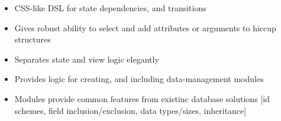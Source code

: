 






\medskip



\vspace{-0.2cm}
\vspace{0.2cm}

\begin{itemize}
  \item CSS-like DSL for state dependencies, and transitions
  \item Gives robust ability to select and add attributes or arguments to hiccup structures
  \item Separates state and view logic elegantly
\end{itemize}

\divider

\begin{itemize}
    \item Provides logic for creating, and including data-management modules
    \item Modules provide common features from existinc database solutions [id schemes, field inclusion/exclusion, data types/sizes, inheritance]
\end{itemize}
%
\divider


